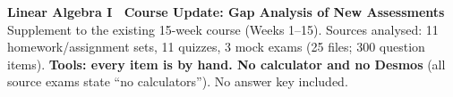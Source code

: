 \documentclass[9pt]{article}
\begin{document}
\begin{tcolorbox}[colback=NAVY!5,colframe=NAVY,boxrule=0.7pt,arc=3pt]
{\Large\bfseries\color{NAVY}Linear Algebra I \textperiodcentered\ Course Update: Gap Analysis of New Assessments}\\
\small Supplement to the existing 15-week course (Weeks 1--15). Sources analysed: 11 homework/assignment sets, 11 quizzes, 3 mock exams (25 files; 300 question items). \textbf{Tools: every item is by hand. No calculator and no Desmos} (all source exams state ``no calculators''). No answer key included.
\end{tcolorbox}
\end{document}

